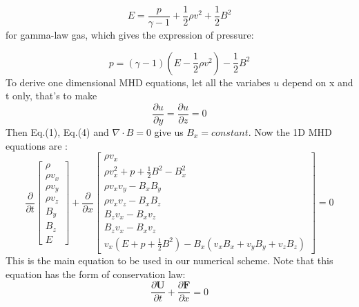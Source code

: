 \documentclass[11pt, oneside]{article}   	%
\begin{document}
\begin{equation}
    E = \frac{p}{\gamma -1} +  \frac { 1 } { 2 } \rho v ^ 2 + \frac { 1 } { 2} B ^ { 2 }
\end{equation}
for gamma-law gas, which gives the expression of pressure:

\begin{equation}
    p = ( \gamma - 1 ) \left( E - \frac { 1 } { 2 } \rho v ^ { 2 } \right) - \frac { 1 } { 2 } B ^ { 2 }
\end{equation}
To derive one dimensional MHD equations, let all the variabes $u$ depend on x and t only, that's to make 
\begin{equation}
    \frac{\partial u}{\partial y} = \frac{\partial u}{\partial z}=0
\end{equation}
Then Eq.(1), Eq.(4) and $\nabla \cdot B = 0$ give us $B_x = constant$. Now the 1D MHD equations are :
\begin{equation}
  \frac { \partial } { \partial t } \left[ \begin{array} { c } { \rho } \\ { \rho v _ { x } } \\ { \rho v _ { y } } \\ { \rho v _ { z } } \\ { B _ { y } } \\ { B _ { z } } \\ { E } \end{array} \right] + \frac { \partial } { \partial x } \left[ \begin{array} { c } { \rho v _ { x } } \\ { \rho v _ { x } ^ { 2 } + p + \frac { 1 } { 2 } B ^ { 2 } - B _ { x } ^ { 2 } } \\ { \rho v _ { x } v _ { y } - B _ { x } B _ { y } } \\ { \rho v _ { x } v _ { z } - B _ { x } B _ { z } } \\ { B _ { z } v _ { x } - B _ { x } v _ { z } } \\ { B _ { z } v _ { x } - B _ { x } v _ { z } } \\ { v _ { x } \left( E + p + \frac { 1 } { 2 } B ^ { 2 } \right) - B _ { x } \left( v _ { x } B _ { x } + v _ { y } B _ { y } + v _ { z } B _ { z } \right) } \end{array} \right] = 0  
\end{equation}
This is the main equation to be used in our numerical scheme. Note that this equation has the form of conservation law:
\begin{equation}
    \frac{\partial \textbf{U}}{\partial t} + \frac{\partial \textbf{F}}{\partial x} = 0
\end{equation}
\end{document}
